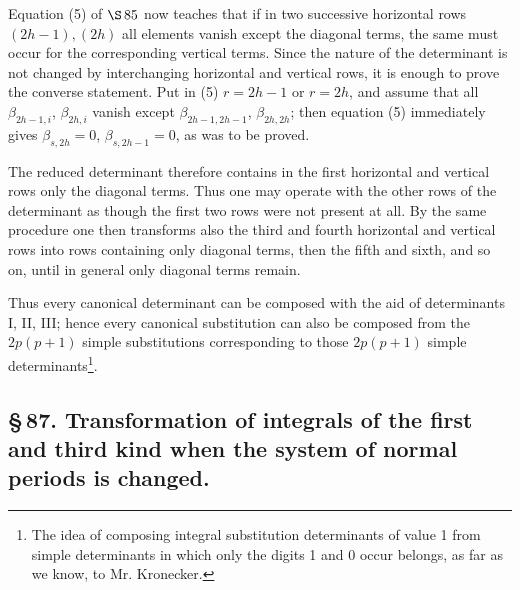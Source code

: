 \documentclass[10pt]{article}
\begin{document}
Equation (5) of \(\S\,85\) now teaches that if in two successive horizontal rows \((2h-1),(2h)\) all elements vanish except the diagonal terms, the same must occur for the corresponding vertical terms. Since the nature of the determinant is not changed by interchanging horizontal and vertical rows, it is enough to prove the converse statement. Put in (5) \(r=2h-1\) or \(r=2h\), and assume that all \(\beta_{2h-1,i}\), \(\beta_{2h,i}\) vanish except \(\beta_{2h-1,2h-1}\), \(\beta_{2h,2h}\); then equation (5) immediately gives \(\beta_{s,2h}=0\), \(\beta_{s,2h-1}=0\), as was to be proved.

The reduced determinant therefore contains in the first horizontal and vertical rows only the diagonal terms. Thus one may operate with the other rows of the determinant as though the first two rows were not present at all. By the same procedure one then transforms also the third and fourth horizontal and vertical rows into rows containing only diagonal terms, then the fifth and sixth, and so on, until in general only diagonal terms remain.

Thus every canonical determinant can be composed with the aid of determinants I, II, III; hence every canonical substitution can also be composed from the \(2p(p+1)\) simple substitutions corresponding to those \(2p(p+1)\) simple determinants\footnote{The idea of composing integral substitution determinants of value 1 from simple determinants in which only the digits 1 and 0 occur belongs, as far as we know, to Mr. Kronecker.}.

\subsection*{\S\,87. Transformation of integrals of the first and third kind when the system of normal periods is changed.}
\end{document}
